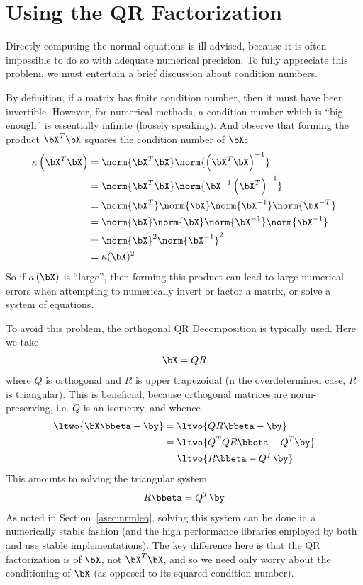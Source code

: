 \section{Using the QR Factorization}
\label{asec:qr}
Directly computing the normal equations is ill advised, because it is often impossible to do so with adequate numerical precision.  To fully appreciate this problem, we must entertain a brief discussion about condition numbers.

By definition, if a matrix has finite condition number, then it must have been invertible.  However, for numerical methods, a condition number which is ``big enough'' is essentially infinite (loosely speaking).  And observe that forming the product $\bX^T\bX$ squares the condition number of $\bX$:
\begin{align*}
\kappa\left(\bX^T\bX\right) &= \norm{\bX^T\bX}\norm{\left(\bX^T\bX\right)^{-1}}\\
  &=\norm{\bX^T\bX} \norm{\bX^{-1}\left(\bX^T\right)^{-1}}\\
  &=\norm{\bX^T} \norm{\bX} \norm{\bX^{-1}} \norm{\bX^{-T}}\\
  &=\norm{\bX} \norm{\bX} \norm{\bX^{-1}} \norm{\bX^{-1}}\\
  &= \norm{\bX}^2 \norm{\bX^{-1}}^2\\
  &=\kappa(\bX)^2
\end{align*}
So if $\kappa\left(\bX\right)$ is ``large'', then forming this product can lead to large numerical errors when attempting to numerically invert or factor a matrix, or solve a system of equations.

To avoid this problem, the orthogonal QR Decomposition is typically used.  Here we take 
\begin{align*}
\bX=QR
\end{align*}
where $Q$ is orthogonal and $R$ is upper trapezoidal (n the overdetermined case, $R$ is triangular).  This is beneficial, because orthogonal matrices are norm-preserving, i.e. $Q$ is an isometry, and whence
\begin{align*}
\ltwo{\bX\bbeta - \by} &= \ltwo{QR\bbeta - \by}\\
  &= \ltwo{Q^TQR\bbeta - Q^T\by}\\
  &= \ltwo{R\bbeta - Q^T\by}
\end{align*}
This amounts to solving the triangular system
\begin{align*}
R\bbeta = Q^T\by
\end{align*}
As noted in Section~\ref{asec:nrmleq}, solving this system can be done in a numerically stable fashion (and the high performance libraries employed by both  and
 use stable implementations).  The key difference here is that the QR factorization is of $\bX$, not $\bX^T\bX$, and so we need only worry about the conditioning of $\bX$ (as opposed to its squared condition number).

